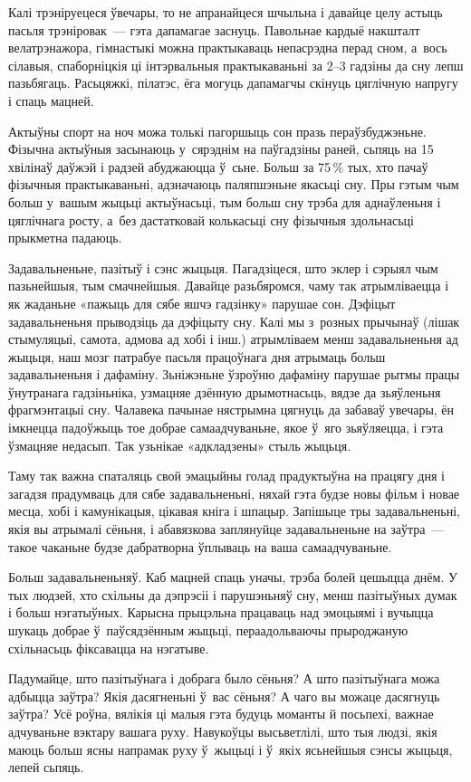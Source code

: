 Калі трэніруецеся ўвечары, то не апранайцеся шчыльна і давайце целу астыць пасьля трэніровак~--- гэта дапамагае заснуць. Павольнае кардыё накшталт велатрэнажора, гімнастыкі можна практыкаваць непасрэдна перад сном, а~вось сілавыя, спаборніцкія ці інтэрвальныя практыкаваньні за 2--3 гадзіны да сну лепш пазьбягаць. Расьцяжкі, пілатэс, ёга могуць дапамагчы скінуць цяглічную напругу і спаць мацней.

Актыўны спорт на ноч можа толькі пагоршыць сон празь пераўзбуджэньне. Фізычна актыўныя засынаюць у~сярэднім на паўгадзіны раней, сьпяць на 15 хвілінаў даўжэй і радзей абуджаюцца ў~сьне. Больш за 75\,\% тых, хто пачаў фізычныя практыкаваньні, адзначаюць паляпшэньне якасьці сну. Пры гэтым чым больш у~вашым жыцьці актыўнасьці, тым больш сну трэба для аднаўленьня і цяглічнага росту, а~без дастатковай колькасьці сну фізычныя здольнасьці прыкметна падаюць.

Задавальненьне, пазітыў і сэнс жыцьця. Пагадзіцеся, што эклер і сэрыял чым пазьнейшыя, тым смачнейшыя. Давайце разьбяромся, чаму так атрымліваецца і як жаданьне «пажыць для сябе яшчэ гадзінку» парушае сон. Дэфіцыт задавальненьня прыводзіць да дэфіцыту сну. Калі мы з~розных прычынаў (лішак стымуляцыі, самота, адмова ад хобі і інш.) атрымліваем менш задавальненьня ад жыцьця, наш мозг патрабуе пасьля працоўнага дня атрымаць больш задавальненьня і дафаміну. Зьніжэньне ўзроўню дафаміну парушае рытмы працы ўнутранага гадзіньніка, узмацняе дзённую дрымотнасьць, вядзе да зьяўленьня фрагмэнтацыі сну. Чалавека пачынае нястрымна цягнуць да забаваў увечары, ён імкнецца падоўжыць тое добрае самаадчуваньне, якое ў~яго зьяўляецца, і гэта ўзмацняе недасып. Так узьнікае «адкладзены» стыль жыцьця.

Таму так важна спаталяць свой эмацыйны голад прадуктыўна на працягу дня і загадзя прадумваць для сябе задавальненьні, няхай гэта будзе новы фільм і новае месца, хобі і камунікацыя, цікавая кніга і шпацыр. Запішыце тры задавальненьні, якія вы атрымалі сёньня, і абавязкова заплянуйце задавальненьне на заўтра~--- такое чаканьне будзе дабратворна ўплываць на ваша самаадчуваньне.

Больш задавальненьняў. Каб мацней спаць уначы, трэба болей цешыцца днём. У тых людзей, хто схільны да дэпрэсіі і парушэньняў сну, менш пазітыўных думак і больш нэгатыўных. Карысна прыцэльна працаваць над эмоцыямі і вучыцца шукаць добрае ў~паўсядзённым жыцьці, пераадольваючы прыроджаную схільнасьць фіксавацца на нэгатыве.

Падумайце, што пазітыўнага і добрага было сёньня? А што пазітыўнага можа адбыцца заўтра? Якія дасягненьні ў~вас сёньня? А чаго вы можаце дасягнуць заўтра? Усё роўна, вялікія ці малыя гэта будуць моманты й посьпехі, важнае адчуваньне вэктару вашага руху. Навукоўцы высьветлілі, што тыя людзі, якія маюць больш ясны напрамак руху ў~жыцьці і ў~якіх ясьнейшыя сэнсы жыцьця, лепей сьпяць.

